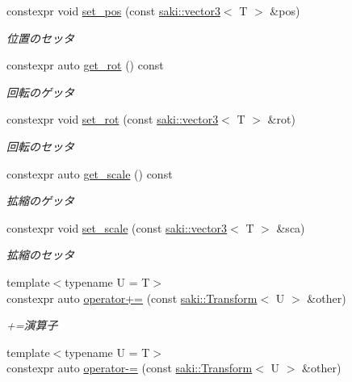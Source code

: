\begin{DoxyCompactItemize}
constexpr void \mbox{\hyperlink{classsaki_1_1_transform_a6a7dbfc0e3d9f1f76bb2279ac92a473b}{set\+\_\+pos}} (const \mbox{\hyperlink{classsaki_1_1vector3}{saki\+::vector3}}$<$ T $>$ \&pos)
\begin{DoxyCompactList}\small\item\em 位置のセッタ \end{DoxyCompactList}\item 
constexpr auto \mbox{\hyperlink{classsaki_1_1_transform_a1b276b8bd5f894f1ed84b9e0c18b7bbf}{get\+\_\+rot}} () const
\begin{DoxyCompactList}\small\item\em 回転のゲッタ \end{DoxyCompactList}\item 
constexpr void \mbox{\hyperlink{classsaki_1_1_transform_a8678bfb9e2e9041848fa41ebe6bc7be3}{set\+\_\+rot}} (const \mbox{\hyperlink{classsaki_1_1vector3}{saki\+::vector3}}$<$ T $>$ \&rot)
\begin{DoxyCompactList}\small\item\em 回転のセッタ \end{DoxyCompactList}\item 
constexpr auto \mbox{\hyperlink{classsaki_1_1_transform_a9bf1b1c0b061165e67013538bc2afdb2}{get\+\_\+scale}} () const
\begin{DoxyCompactList}\small\item\em 拡縮のゲッタ \end{DoxyCompactList}\item 
constexpr void \mbox{\hyperlink{classsaki_1_1_transform_af6bda82cb33bd6b5ece0dc11db6a7c1e}{set\+\_\+scale}} (const \mbox{\hyperlink{classsaki_1_1vector3}{saki\+::vector3}}$<$ T $>$ \&sca)
\begin{DoxyCompactList}\small\item\em 拡縮のセッタ \end{DoxyCompactList}\item 
{\footnotesize template$<$typename U  = T$>$ }\\constexpr auto \mbox{\hyperlink{classsaki_1_1_transform_a42871283dd6c56bd5a452efd91e1076c}{operator+=}} (const \mbox{\hyperlink{classsaki_1_1_transform}{saki\+::\+Transform}}$<$ U $>$ \&other)
\begin{DoxyCompactList}\small\item\em +=演算子 \end{DoxyCompactList}\item 
{\footnotesize template$<$typename U  = T$>$ }\\constexpr auto \mbox{\hyperlink{classsaki_1_1_transform_a64731a50be44c04abd0a4cc2442ceed2}{operator-\/=}} (const \mbox{\hyperlink{classsaki_1_1_transform}{saki\+::\+Transform}}$<$ U $>$ \&other)

\end{DoxyCompactItemize}
